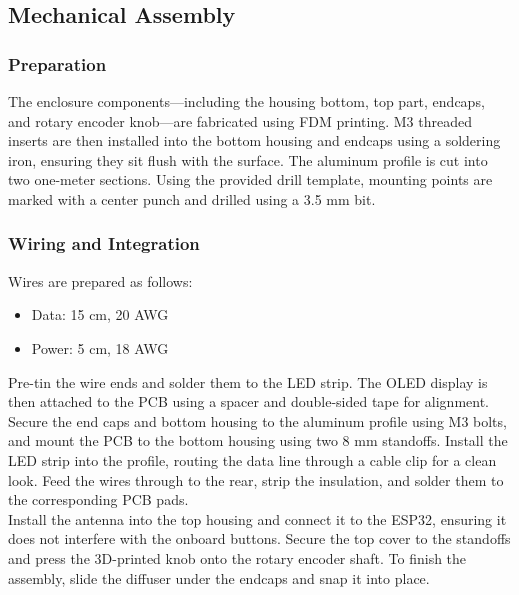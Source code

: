 \subsection{Mechanical Assembly}
\subsubsection{Preparation}
The enclosure components—including the housing bottom, top part, endcaps, and rotary encoder knob—are fabricated using \ac{FDM} printing.
M3 threaded inserts are then installed into the bottom housing and endcaps using a soldering iron, ensuring they sit flush with the surface.
The aluminum profile is cut into two one-meter sections.
Using the provided drill template, mounting points are marked with a center punch and drilled using a 3.5 mm bit.

\subsubsection{Wiring and Integration}
Wires are prepared as follows:
\begin{itemize}
	\item Data: 15 cm, 20 \ac{AWG}
	\item Power: 5 cm, 18 \ac{AWG}
\end{itemize}
Pre-tin the wire ends and solder them to the \ac{LED} strip.
The \ac{OLED} display is then attached to the \ac{PCB} using a spacer and double-sided tape for alignment. \\

Secure the end caps and bottom housing to the aluminum profile using M3 bolts, and mount the \ac{PCB} to the bottom housing using two 8 mm standoffs.
Install the \ac{LED} strip into the profile, routing the data line through a cable clip for a clean look.
Feed the wires through to the rear, strip the insulation, and solder them to the corresponding \ac{PCB} pads. \\

Install the antenna into the top housing and connect it to the ESP32, ensuring it does not interfere with the onboard buttons.
Secure the top cover to the standoffs and press the 3D-printed knob onto the rotary encoder shaft.
To finish the assembly, slide the diffuser under the endcaps and snap it into place.
